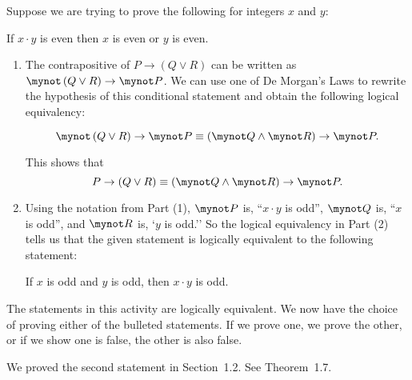 \documentclass[11pt]{article}
\begin{document}
\noindent
Suppose we are trying to prove the following for integers  $x$  and  $y$:

\begin{center}
If  $x \cdot y$  is even then  $x$  is  even  or  $y$  is even.
\end{center}

\begin{enumerate}

\item The contrapositive of  $P \to \left( {Q \vee R} \right)$ can be written as  
$\mynot  \left( {Q \vee R} \right) \to \mynot  P$.  We can use one of De Morgan's Laws to rewrite the hypothesis of this conditional statement and obtain the following logical equivalency:

\[
\mynot  \left( {Q \vee R} \right) \to \mynot  P \equiv \left( {\mynot  Q \wedge \mynot  R} \right) \to \mynot  P.
\]

This shows that
\[
P \to \left( {Q \vee R} \right) \equiv \left( {\mynot  Q \wedge \mynot  R} \right) \to \mynot  P.
\]

\item Using the notation from Part (1),  $\mynot  P$ is, ``$x \cdot y$  is odd'',  
$\mynot  Q$  is, ``$x$  is odd'', and  $\mynot  R$  is, `$y$ is odd.''  So the logical equivalency in Part (2) tells us that  the given statement is logically equivalent to the following statement:

\begin{center}
If  $x$  is  odd and  $y$  is odd, then  $x \cdot y$  is odd.
\end{center}
\end{enumerate}
The statements in this activity are logically equivalent.  We now have the choice of proving either of the bulleted statements.  If we prove one, we prove the other, or if we show one is false, the other is also false.

\newpar
We proved the second statement in Section~1.2.  See Theorem~1.7.
\end{document}
